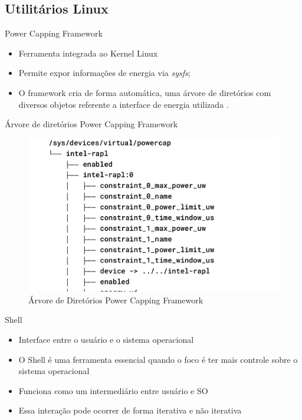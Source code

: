 \subsection{Utilitários Linux}
\begin{frame}{Power Capping Framework}
    \begin{itemize}
        \item Ferramenta integrada ao Kernel Linux
        \item Permite expor informações de energia via \emph{sysfs};
        \item O framework cria de forma automática, uma árvore de diretórios com
        diversos objetos referente a interface de energia utilizada \cite{kernel_org}.
    \end{itemize}
\end{frame}

\begin{frame}{Árvore de diretórios Power Capping Framework}
    \begin{figure}
        \centering
        \includegraphics[width=0.65\linewidth]{images/powercap-tree.png}
        \caption{Árvore de Diretórios Power Capping Framework}
        \label{fig:powercap-tree}
    \end{figure}
\end{frame}

\begin{frame}{Shell}
    \begin{itemize}
        \item Interface entre o usuário e o sistema operacional
        \item O Shell é uma ferramenta essencial quando o foco é ter mais controle sobre o sistema operacional \cite{raymond2003art}
        \item Funciona como um intermediário entre usuário e SO
        \item Essa interação pode ocorrer de forma iterativa e não iterativa
    \end{itemize}
\end{frame}

